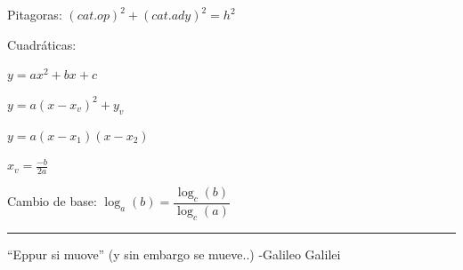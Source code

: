 \documentclass[a4paper,11pt,spanish,sans]{exam}
\begin{document}
Pitagoras: $
(cat.op)^2+(cat.ady)^2=h^2
$

Cuadráticas:

$y=ax^2+bx+c$

$y=a(x-x_v)^2+y_v$

$y=a(x-x_1)(x-x_2)$

$x_v=\frac{-b}{2a}$

Cambio de base: $\log_a(b)=\dfrac{\log_c(b)}{\log_c(a)}$

\rule[2ex]{\textwidth}{1pt}

“Eppur si muove” (y sin embargo se mueve..)  -Galileo Galilei 
\end{document}
